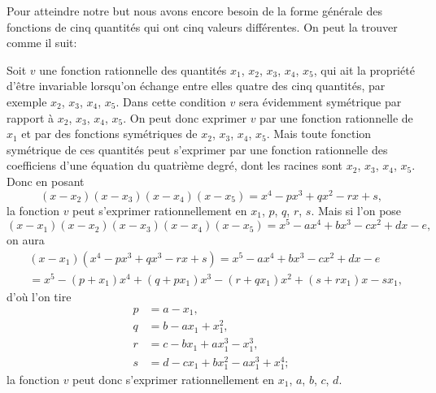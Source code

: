 \documentclass[oneside, 12 pt, leqno]{memoir}
\begin{document}
Pour atteindre notre but nous avons encore besoin de la forme générale des fonctions de cinq quantités qui ont cinq valeurs différentes. On peut la trouver comme il suit:

Soit \(v\) une fonction rationnelle des quantités \(x_1\), \(x_2\), \(x_3\), \(x_4\), \(x_5\), qui ait la propriété d'être invariable lorsqu'on échange entre elles quatre des cinq quantités, par exemple \(x_2\), \(x_3\), \(x_4\), \(x_5\). Dans cette condition \(v\) sera évidemment symétrique par rapport à \(x_2\), \(x_3\), \(x_4\), \(x_5\). On peut donc exprimer \(v\) par une fonction rationnelle de \(x_1\) et par des fonctions symétriques de \(x_2\), \(x_3\), \(x_4\), \(x_5\). Mais toute fonction symétrique de ces quantités peut s'exprimer par une fonction rationnelle des coefficiens d'une équation du quatrième degré, dont les racines sont \(x_2\), \(x_3\), \(x_4\), \(x_5\). Donc en posant
\[\left(x-x_2\right)\left(x-x_3\right)\left(x-x_4\right)\left(x-x_5\right)=x^4-p x^3+q x^2-r x+s,\]
la fonction \(v\) peut s'exprimer rationnellement en \(x_1\), \(p\), \(q\), \(r\), \(s\). Mais si l'on pose
\[\left(x-x_1\right)\left(x-x_2\right)\left(x-x_3\right)\left(x-x_4\right)\left(x-x_5\right)=x^5-a x^4+b x^3-c x^2+d x-e,\]
on aura
\[\begin{aligned}
& \left(x-x_1\right)\left(x^4-p x^3+q x^3-r x+s\right)=x^5-a x^4+b x^3-c x^2+d x-e \\
& =x^5-\left(p+x_1\right) x^4+\left(q+p x_1\right) x^3-\left(r+q x_1\right) x^2+\left(s+r x_1\right) x-s x_1,
\end{aligned}\]
d'où l'on tire
\[\begin{aligned}
p & =a-x_1, \\
q & =b-a x_1+x_1^2, \\
r & =c-b x_1+a x_1^3-x_1^3, \\
 s & =d-c x_1+b x_1^2-a x_1^3+x_1^4;
\end{aligned}\]
la fonction \(v\) peut donc s'exprimer rationnellement en \(x_1\), \(a\), \(b\), \(c\), \(d\). 
\end{document}
